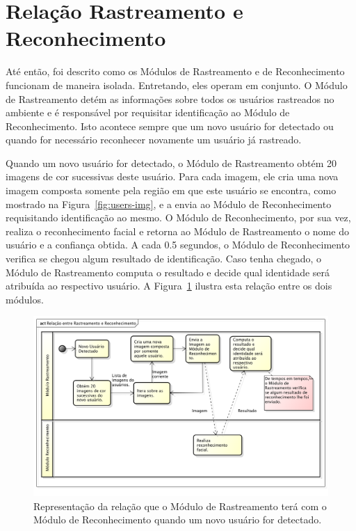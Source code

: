 \section{Relação Rastreamento e Reconhecimento}
\label{sec:rastreamento-reconhecimento}

	Até então, foi descrito como os Módulos de Rastreamento e de Reconhecimento funcionam de maneira isolada. Entretando, eles operam em conjunto. O Módulo de Rastreamento detém as informações sobre todos os usuários rastreados no ambiente e é responsável por requisitar identificação ao Módulo de Reconhecimento. Isto acontece sempre que um novo usuário for detectado ou quando for necessário reconhecer novamente um usuário já rastreado.


	Quando um novo usuário for detectado, o Módulo de Rastreamento obtém 20 imagens de cor sucessivas deste usuário. Para cada imagem, ele cria uma nova imagem composta somente pela região em que este usuário se encontra, como mostrado na Figura~\ref{fig:users-img}, e a envia ao Módulo de Reconhecimento requisitando identificação ao mesmo. O Módulo de Reconhecimento, por sua vez, realiza o reconhecimento facial e retorna ao Módulo de Rastreamento o nome do usuário e a confiança obtida. A cada 0.5 segundos, o Módulo de Reconhecimento verifica se chegou algum resultado de identificação. Caso tenha chegado, o Módulo de Rastreamento computa o resultado e decide qual identidade será atribuída ao respectivo usuário. A Figura~\ref{fig:rastreamento-reconhecimento} ilustra esta relação entre os dois módulos.

		\begin{figure}[htb]
			\begin{center}
				\includegraphics[scale=0.5]{figuras/4.ProblemaEProposta/diagrama-relacao.png}
			\end{center}
			\caption{Representação da relação que o Módulo de Rastreamento terá com o Módulo de Reconhecimento quando um novo usuário for detectado.}
			\label{fig:rastreamento-reconhecimento}
		\end{figure}
	
